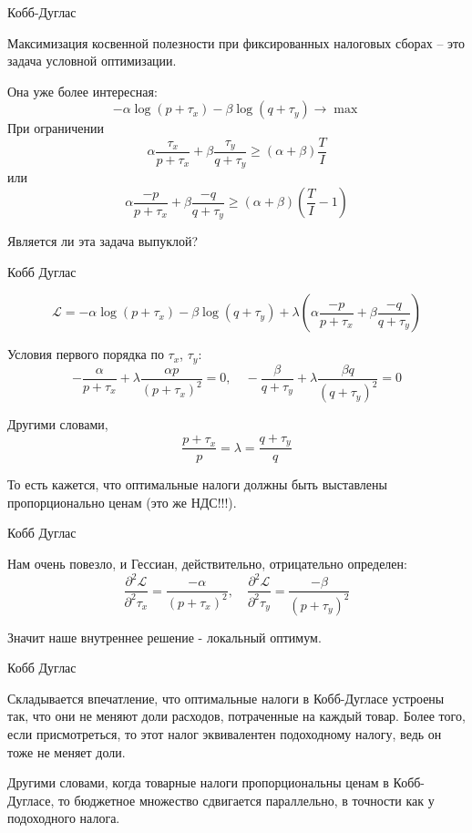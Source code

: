 \documentclass{beamer}
\begin{document}
\begin{frame}{Кобб-Дуглас}

Максимизация косвенной полезности при фиксированных налоговых сборах – это задача условной оптимизации. 

Она уже более интересная:
$$- \alpha \log(p + \tau_x) - \beta \log (q + \tau_y) \to \max$$
При ограничении $$\alpha \frac{\tau_x}{p+\tau_x} + \beta \frac{\tau_y}{q+\tau_y} \geqslant (\alpha + \beta)\frac{T}{I}$$
или
$$\alpha \frac{-p}{p+\tau_x} + \beta \frac{-q}{q+\tau_y} \geqslant (\alpha + \beta)(\frac{T}{I}-1)$$

Является ли эта задача выпуклой?

\end{frame}

\begin{frame}{Кобб Дуглас}

$$ \mathcal{L} = - \alpha \log(p + \tau_x) - \beta \log (q + \tau_y) + \lambda (\alpha \frac{-p}{p+\tau_x} + \beta \frac{-q}{q+\tau_y})$$

Условия первого порядка по $\tau_x$, $\tau_y$:
$$ - \frac{\alpha}{p + \tau_x} + \lambda \frac{\alpha p}{(p + \tau_x)^2} = 0, \quad - \frac{\beta}{q + \tau_y} + \lambda \frac{\beta q}{(q + \tau_y)^2} = 0$$

Другими словами,
$$\frac{p + \tau_x}{p} = \lambda = \frac{q + \tau_y}{q}$$

То есть кажется, что оптимальные налоги должны быть выставлены пропорционально ценам (это же НДС!!!). 

\end{frame}

\begin{frame}{Кобб Дуглас}

Нам очень повезло, и Гессиан, действительно, отрицательно определен:
$$ \frac{\partial^2 \mathcal{L}}{\partial^2 \tau_x} = \frac{-\alpha}{(p+\tau_x)^2}, \quad \frac{\partial^2 \mathcal{L}}{\partial^2 \tau_y} = \frac{-\beta}{(p+\tau_y)^2}$$

Значит наше внутреннее решение - локальный оптимум.

\end{frame}

\begin{frame}{Кобб Дуглас}

Складывается впечатление, что оптимальные налоги в Кобб-Дугласе устроены так, что они не меняют доли расходов, потраченные на каждый товар. Более того, если присмотреться, то этот налог эквивалентен подоходному налогу, ведь он тоже не меняет доли. 

Другими словами, когда товарные налоги пропорциональны ценам в Кобб-Дугласе, то бюджетное множество сдвигается параллельно, в точности как у подоходного налога.

\end{frame}
\end{document}
